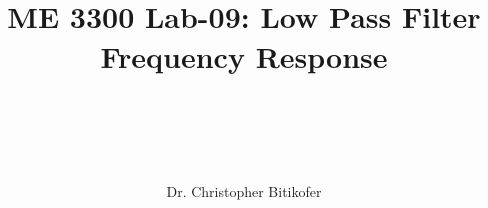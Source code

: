 
\title{
\begin{center}
\HRule \\[0.4cm]
{\Huge \bfseries ME 3300 Lab-09: 
Low Pass Filter Frequency Response \\[0.5cm] 
}\\[0.4cm] %
\HRule \\[1.5cm]
\end{center}
}
\author{\Large Dr. Christopher Bitikofer \\ \\ \\[.1cm]} %
\date{} %

\maketitle
\tableofcontents